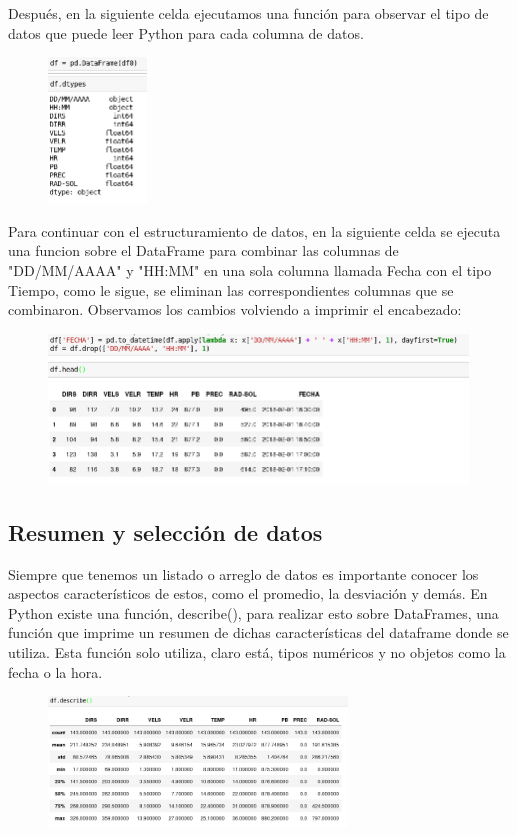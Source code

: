 \documentclass{article}
\begin{document}
Después, en la siguiente celda ejecutamos una función para observar el tipo de datos que puede leer Python para cada columna de datos.
\begin{figure}[ht]
\centering
\includegraphics[height=146px,width=99px]{4th5thcell.png}
\end{figure}

\newpage

Para continuar con el estructuramiento de datos, en la siguiente celda se ejecuta una funcion sobre el DataFrame para combinar las columnas de "DD/MM/AAAA" y "HH:MM" en una sola columna llamada Fecha con el tipo Tiempo, como le sigue, se eliminan las correspondientes columnas que se combinaron. Observamos los cambios volviendo a imprimir el encabezado:
\begin{figure}[h]
\centering
\includegraphics[height=150px,width=421px]{6th7thcell.png}
\end{figure}

\subsection{Resumen y selección de datos}

Siempre que tenemos un listado o arreglo de datos es importante conocer los aspectos característicos de estos, como el promedio, la desviación y demás. En Python existe una función, describe(), para realizar esto sobre DataFrames, una función que imprime un resumen de dichas características del dataframe donde se utiliza. Esta función solo utiliza, claro está, tipos numéricos y no objetos como la fecha o la hora.
\begin{figure}[ht]
\centering
\includegraphics[height=131px,width=300px]{8thcell.png}
\end{figure}
\end{document}
